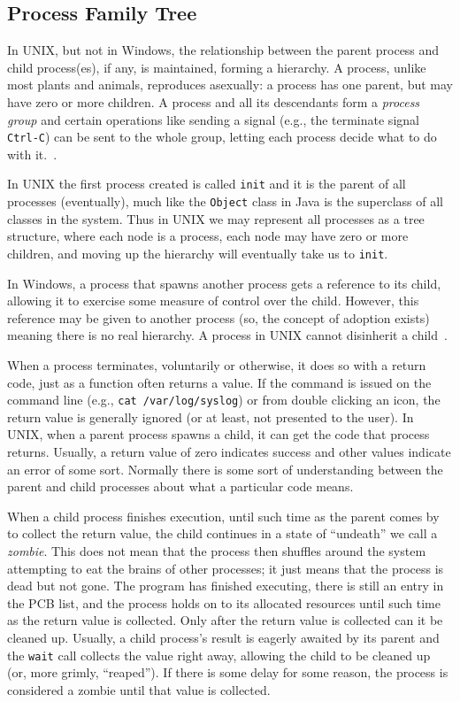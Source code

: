 \subsection*{Process Family Tree}
In UNIX, but not in Windows, the relationship between the parent process and child process(es), if any, is maintained, forming a hierarchy. A process, unlike most plants and animals, reproduces asexually: a process has one parent, but may have zero or more children. A process and all its descendants form a \textit{process group} and certain operations like sending a signal (e.g., the terminate signal \texttt{Ctrl-C}) can be sent to the whole group, letting each process decide what to do with it.~\cite{mos}.

In UNIX the first process created is called \texttt{init} and it is the parent of all processes (eventually), much like the \texttt{Object} class in Java is the superclass of all classes in the system. Thus in UNIX we may represent all processes as a tree structure, where each node is a process, each node may have zero or more children, and moving up the hierarchy will eventually take us to \texttt{init}.

In Windows, a process that spawns another process gets a reference to its child, allowing it to exercise some measure of control over the child. However, this reference may be given to another process (so, the concept of adoption exists) meaning there is no real hierarchy. A process in UNIX cannot disinherit a child~\cite{mos}.

When a process terminates, voluntarily or otherwise, it does so with a return code, just as a function often returns a value. If the command is issued on the command line (e.g., \texttt{cat /var/log/syslog}) or from double clicking an icon, the return value is generally ignored (or at least, not presented to the user). In UNIX, when a parent process spawns a child, it can get the code that process returns. Usually, a return value of zero indicates success and other values indicate an error of some sort. Normally there is some sort of understanding between the parent and child processes about what a particular code means.

When a child process finishes execution, until such time as the parent comes by to collect the return value, the child continues in a state of ``undeath'' we call a \textit{zombie}. This does not mean that the process then shuffles around the system attempting to eat the brains of other processes; it just means that the process is dead but not gone. The program has finished executing, there is still an entry in the PCB list, and the process holds on to its allocated resources until such time as the return value is collected. Only after the return value is collected can it be cleaned up. Usually, a child process's result is eagerly awaited by its parent and the \texttt{wait} call collects the value right away, allowing the child to be cleaned up (or, more grimly, ``reaped''). If there is some delay for some reason, the process is considered a zombie until that value is collected.

